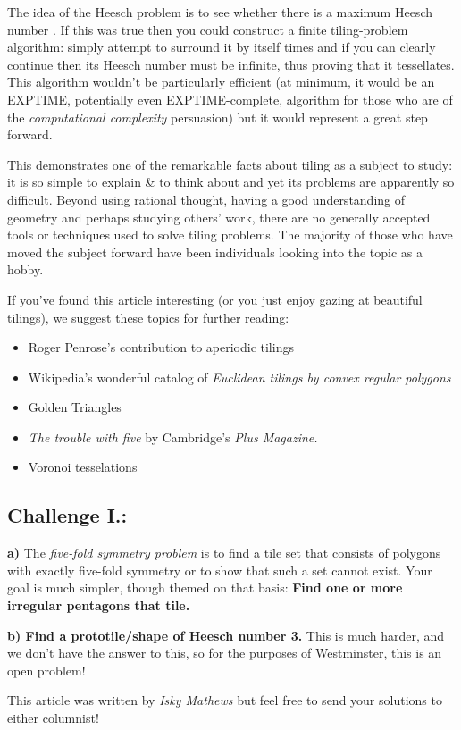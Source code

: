 The idea of the Heesch problem is to see whether there is a maximum
Heesch number . If this was true then you could construct a finite
tiling-problem algorithm: simply attempt to surround it by itself times
and if you can clearly continue then its Heesch number must be infinite,
thus proving that it tessellates. This algorithm wouldn't be
particularly efficient (at minimum, it would be an EXPTIME, potentially
even EXPTIME-complete, algorithm for those who are of the
\emph{computational complexity} persuasion) but it would represent a
great step forward.

This demonstrates one of the remarkable facts about tiling as a subject
to study: it is so simple to explain \& to think about and yet its
problems are apparently so difficult. Beyond using rational thought,
having a good understanding of geometry and perhaps studying others'
work, there are no generally accepted tools or techniques used to solve
tiling problems. The majority of those who have moved the subject
forward have been individuals looking into the topic as a hobby.

If you've found this article interesting (or you just enjoy gazing at
beautiful tilings), we suggest these topics for further reading:

\begin{itemize}
\item
  Roger Penrose's contribution to aperiodic tilings
\item
  Wikipedia's wonderful catalog of \emph{Euclidean tilings by convex
  regular polygons}
\item
  Golden Triangles
\item
  \emph{The trouble with five }by Cambridge's \emph{Plus Magazine.}
\item
  Voronoi tesselations
\end{itemize}

\subsection{Challenge I.:}\label{challenge-i.}

\textbf{a) }The \emph{five-fold symmetry problem }is to find a tile set
that consists of polygons with exactly five-fold symmetry or to show
that such a set cannot exist. Your goal is much simpler, though themed
on that basis: \textbf{Find one or more irregular pentagons that tile.}

\textbf{b) Find a prototile/shape of Heesch number 3. }This is much
harder, and we don't have the answer to this, so for the purposes of
Westminster, this is an open problem!

This article was written by \emph{Isky Mathews} but feel free to send
your solutions to either columnist!
